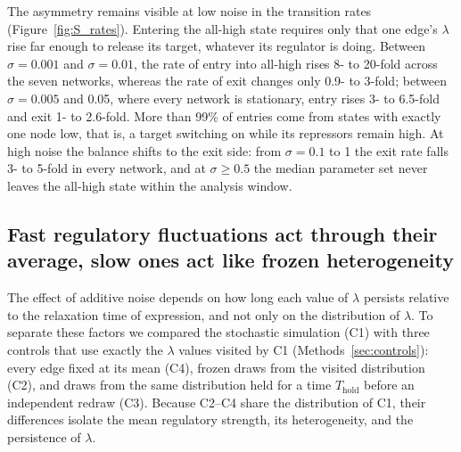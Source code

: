 \documentclass[11pt]{article}
\providecommand{\DIFaddtex}[1]{{\protect\color{red}#1}} %
\providecommand{\DIFdeltex}[1]{} %
\providecommand{\DIFaddbegin}{} %
\providecommand{\DIFaddend}{} %
\providecommand{\DIFdelbegin}{} %
\providecommand{\DIFdelend}{} %
\providecommand{\DIFadd}[1]{\texorpdfstring{\DIFaddtex{#1}}{#1}} %
\providecommand{\DIFdel}[1]{\texorpdfstring{\DIFdeltex{#1}}{}} %
\providecommand{\DIFaddincludegraphics}[2][]{\DIFOincludegraphics[#1]{#2}} %
\providecommand{\DIFdelincludegraphics}[2][]{}
\DeclareRobustCommand{\DIFaddbegin}{\DIFOaddbegin \let\includegraphics\DIFaddincludegraphics} %
\DeclareRobustCommand{\DIFaddend}{\DIFOaddend \let\includegraphics\DIFOincludegraphics} %
\DeclareRobustCommand{\DIFdelbegin}{\DIFOdelbegin \let\includegraphics\DIFdelincludegraphics} %
\DeclareRobustCommand{\DIFdelend}{\DIFOaddend \let\includegraphics\DIFOincludegraphics} %
\begin{document}
\DIFadd{The asymmetry remains visible at low noise in the transition rates (Figure~\ref{fig:S_rates}). Entering the all-high state requires only that one edge's $\lambda$ rise far enough to release its target, whatever its regulator is doing. Between $\sigma = 0.001$ and $\sigma = 0.01$, the rate of entry into all-high rises 8- to 20-fold across the seven networks, whereas the rate of exit changes only 0.9}\DIFaddend - \DIFdelbegin \DIFdel{either }\DIFdelend \DIFaddbegin \DIFadd{to 3-fold; between $\sigma = 0.005$ and 0.05, where every network is stationary, entry rises 3- to 6.5-fold and exit 1- to 2.6-fold. More than 99\% of entries come from states with exactly one node low, that is, a target switching on while its repressors remain high. At high noise the balance shifts to the exit side: from $\sigma = 0.1$ to }\DIFaddend 1 \DIFdelbegin \DIFdel{or 0) . In the extreme $\sigma$ condition, resampled deterministic simulations can only converge to }\DIFdelend \DIFaddbegin \DIFadd{the exit rate falls 3- to 5-fold in every network, and at $\sigma \geq 0.5$ the median parameter set never leaves the all-high state within the analysis window.
}

\subsection{\DIFadd{Fast regulatory fluctuations act through their average, slow ones act like frozen heterogeneity}} \label{sec:timescale}
\DIFadd{The effect of additive noise depends on how long each value of $\lambda$ persists relative to the relaxation time of expression, and not only on the distribution of $\lambda$. To separate these factors we compared the stochastic simulation (C1) with three controls that use exactly the $\lambda$ values visited by C1 (Methods~\ref{sec:controls}): every edge fixed at its mean (C4), frozen draws from the visited distribution (C2), and draws from the same distribution held for a time $T_\text{hold}$ before an independent redraw (C3). Because C2--C4 share the distribution of C1, their differences isolate the mean regulatory strength, its heterogeneity, and the persistence of $\lambda$.
}
\end{document}
